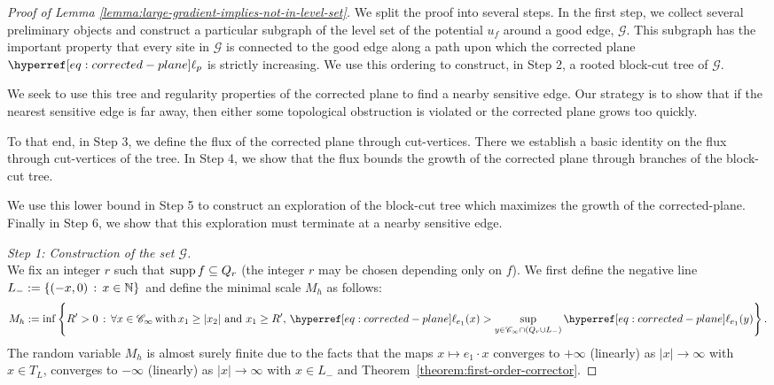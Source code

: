 \documentclass[12pt]{amsart}
\numberwithin{equation}{section}
\begin{document}
	
	\begin{proof}[Proof of Lemma \ref{lemma:large-gradient-implies-not-in-level-set}]
		We split the proof into several steps. In the first step, we collect several preliminary objects 
		and construct a particular subgraph of the level set of the potential $u_f$ around a good edge, $\mathcal{G}$. This subgraph
		has the important property that every site in $\mathcal{G}$ is connected to the good edge along a path
		upon which the corrected plane $\ellp{p}$
		is strictly increasing. We use this ordering to construct, in Step 2, 
		a rooted block-cut tree of $\mathcal{G}$. 
		
		We seek to use this tree and regularity properties of the corrected plane to find a nearby sensitive edge. 
		Our strategy is to show that if the nearest sensitive edge is far away, then either some topological obstruction
		is violated or the corrected plane grows too quickly. 
		
		To that end, in Step 3, we define the flux of the corrected plane through cut-vertices.
		There we establish a basic identity on the flux through cut-vertices of the tree. 
		In Step 4, we show that the flux bounds the growth of the corrected plane through branches
		of the block-cut tree. 
		
		We use this lower bound in Step 5 to construct an exploration of the block-cut tree which 
		maximizes the growth of the corrected-plane. Finally in Step 6, we show that this exploration 
		must terminate at a nearby sensitive edge.
		\medskip
		
		{\it Step 1: Construction of the set $\mathcal{G}$.} \\
		We fix an integer $r$ such that $\mathrm{supp\,} f \subseteq Q_r$ (the integer $r$ may be chosen depending only on $f$). We first define the negative line $L_- := \left\{ (-x , 0) \, : \, x \in \operatorname{\mathbb{N}}  \right\}$ and define the minimal scale $M_h$ as follows:
		\begin{equation} \label{eq:def-Mh}
			M_h := \inf \left\{ R' > 0 \, : \, \forall x \in \mathscr{C}_\infty \, \mbox{with} \, x_1 \geq |x_2| ~\mbox{and}~ x_1 \geq R', \,  \ellp{e_1}(x) > \sup_{y \in \mathscr{C}_\infty \cap ( Q_r \cup L_-)} \ellp{e_1} (y)  \right\}.
		\end{equation}
		The random variable $M_h $ is almost surely finite due to the facts that the maps $x \mapsto e_1 \cdot x$ converges to $+ \infty$ (linearly) as $|x| \to \infty$ with $x \in T_L$, converges to $-\infty$ (linearly) as $|x| \to \infty$ with $x \in L_-$ and Theorem~\ref{theorem:first-order-corrector}.
		

\end{proof}
\end{document}
